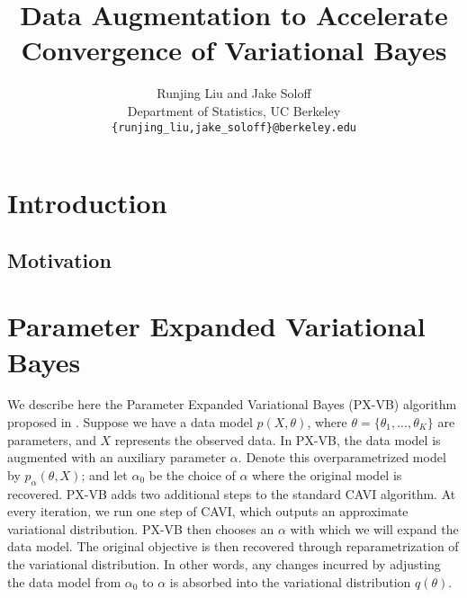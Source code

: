\documentclass{article}
\title{Data Augmentation to Accelerate Convergence of Variational Bayes}
\author{
  Runjing Liu and Jake Soloff \\
  Department of Statistics, UC Berkeley\\
  \texttt{\{runjing\_liu,jake\_soloff\}@berkeley.edu}
}
\begin{document}

\maketitle

\vspace{-1em}

\begin{abstract}

\end{abstract}

\section{Introduction}
\label{introduction}


\subsection{Motivation} 

\newpage

\section{Parameter Expanded Variational Bayes}
\label{PXVB}

We describe here the Parameter Expanded Variational Bayes (PX-VB) algorithm proposed in \cite{Qi2006}. Suppose we have a data model $p(X,\theta)$, where $\theta =  \{\theta_1, ... , \theta_K\}$ are parameters, and $X$ represents the observed data. In PX-VB, the data model is augmented with an auxiliary parameter $\alpha$. Denote this overparametrized model by $p_\alpha(\theta, X)$; and let $\alpha_0$ be the choice of $\alpha$ where the original model is recovered. PX-VB adds two additional steps to the standard CAVI algorithm. At every iteration, we run one step of CAVI, which outputs an approximate variational distribution. PX-VB then chooses an $\alpha$ with which we will expand the data model. The original objective is then recovered through reparametrization of the variational distribution. In other words, any changes incurred by adjusting the data model from $\alpha_0$ to $\alpha$ is absorbed into the variational distribution $q(\theta)$. 
\end{document}
